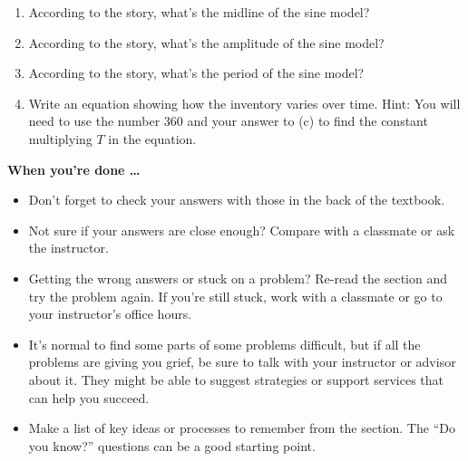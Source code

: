\begin{enumerate}
\begin{enumerate}
    \item According to the story, what's the midline of the sine model?
    \item According to the story, what's the amplitude of the sine model?
    \item According to the story, what's the period of the sine model?
    \item Write an equation showing how the inventory varies over time.  Hint: You will need to use the number 360 and your answer to (c) to find the constant multiplying $T$ in the equation.
\end{enumerate}



\end{enumerate}

\bigskip

\noindent \textbf{When you're done \ldots}

\begin{itemize}
\item Don't forget to check your answers with those in the back of the textbook. 
\item Not sure if your answers are close enough? Compare with a classmate or ask the instructor.  
\item Getting the wrong answers or stuck on a problem?  Re-read the section and try the problem again.   If you're still stuck, work with a classmate or go to your instructor's office hours.
\item It's normal to find some parts of some problems difficult, but if all the problems are giving you grief, be sure to talk with your instructor or advisor about it.  They might be able to suggest strategies or support services that can help you succeed.
\item Make a list of key ideas or processes to remember from the section.  The ``Do you know?'' questions can be a good starting point.
\end{itemize}




